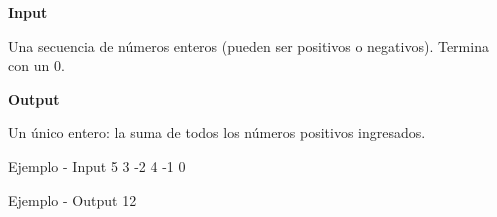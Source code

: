 \documentclass{article}
\begin{document}
\textbf{Input}

Una secuencia de números enteros (pueden ser positivos o negativos). Termina con un $0$.

\vspace{0.5em}
\textbf{Output}

Un único entero: la suma de todos los números positivos ingresados.

\vspace{0.5em}

\begin{container}{Ejemplo - Input}
5 3 -2 4 -1 0
\end{container}

\begin{container}{Ejemplo - Output}
12
\end{container}
\end{document}
